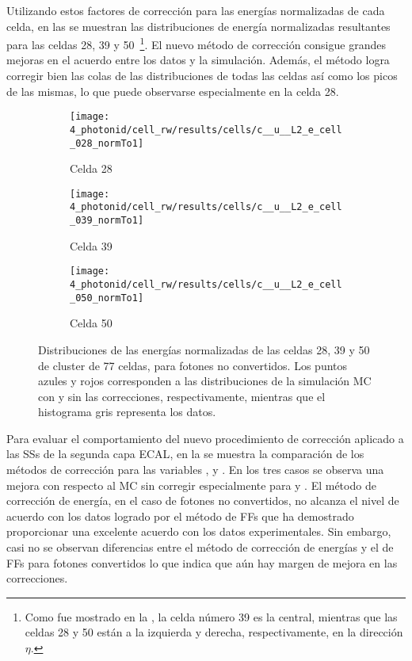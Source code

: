 Utilizando estos factores de corrección para las energías normalizadas de cada celda, en las \Fig{\ref{fig:ss_corrections:cell_rw:results:cells}} se muestran las distribuciones de energía normalizadas resultantes para las celdas 28, 39 y 50~\footnote{Como fue mostrado en la \Fig{\ref{fig:ss_corrections:cell_rw:event_selection:cluster:arrangement}}, la celda número 39 es la central, mientras que las celdas 28 y 50 están a la izquierda y derecha, respectivamente, en la dirección \(\eta\).}. El nuevo método de corrección consigue grandes mejoras en el acuerdo entre los datos y la simulación. Además, el método logra corregir bien las colas de las distribuciones de todas las celdas así como los picos de las mismas, lo que puede observarse especialmente en la celda 28.

\begin{figure}[ht!]
    \centering
    \begin{subfigure}[h]{0.32\linewidth}
        \centering
        \texttt{[image: 4\_photonid/cell\_rw/results/cells/c\_\_u\_\_L2\_e\_cell\_028\_normTo1]}
        \caption{Celda 28}
    \end{subfigure}
    \hfill
    \begin{subfigure}[h]{0.32\linewidth}
        \centering
        \texttt{[image: 4\_photonid/cell\_rw/results/cells/c\_\_u\_\_L2\_e\_cell\_039\_normTo1]}
        \caption{Celda 39}
    \end{subfigure}
    \hfill
    \begin{subfigure}[h]{0.32\linewidth}
        \centering
        \texttt{[image: 4\_photonid/cell\_rw/results/cells/c\_\_u\_\_L2\_e\_cell\_050\_normTo1]}
        \caption{Celda 50}
    \end{subfigure}
    \caption{Distribuciones de las energías normalizadas de las celdas 28, 39 y 50 de cluster de 77 celdas, para fotones no convertidos. Los puntos azules y rojos corresponden a las distribuciones de la simulación \ac{MC} con y sin las correcciones, respectivamente, mientras que el histograma gris representa los datos.}
    \label{fig:ss_corrections:cell_rw:results:cells}
\end{figure}



Para evaluar el comportamiento del nuevo procedimiento de corrección aplicado a las \acp{SS} de la segunda capa \ac{ECAL}, en la \Fig{\ref{fig:ss_corrections:cell_rw:results:ss}} se muestra la comparación de los métodos de corrección para las variables \reta, \rphi y \weta. En los tres casos se observa una mejora con respecto al \ac{MC} sin corregir especialmente para \rphi y \weta. El método de corrección de energía, en el caso de fotones no convertidos, no alcanza el nivel de acuerdo con los datos logrado por el método de \acp{FF} que ha demostrado proporcionar una excelente acuerdo con los datos experimentales. Sin embargo, casi no se observan diferencias entre el método de corrección de energías y el de \acp{FF} para fotones convertidos lo que indica que aún hay margen de mejora en las correcciones.


